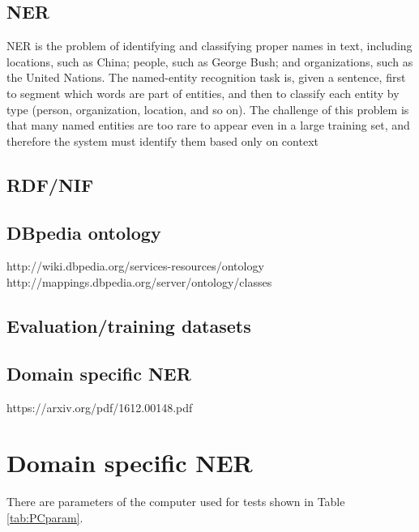 \documentclass[thesis=M,english]{FITthesis}[2012/10/20]
\begin{document}
\section{NER}
NER is the problem of identifying and classifying proper names in text, including locations, such as China; people, such as George Bush; and organizations, such as the United Nations. The named-entity recognition task is, given a sentence, first to segment which words are part of entities, and then to classify each entity by type (person, organization, location, and so on). The challenge of this problem is that many named entities are too rare to appear even in a large training set, and therefore the system must identify them based only on context
\section{RDF/NIF}

\section{DBpedia ontology}
http://wiki.dbpedia.org/services-resources/ontology
http://mappings.dbpedia.org/server/ontology/classes

\section{Evaluation/training datasets}

\section{Domain specific NER}
https://arxiv.org/pdf/1612.00148.pdf

\chapter{Domain specific NER}\label{}

There are parameters of the computer used for tests shown in Table \ref{tab:PCparam}.
\end{document}
